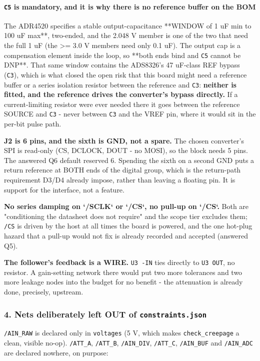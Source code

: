 \documentclass[11pt,a4paper]{article}
\begin{document}
\paragraph*{\texttt{C5} is mandatory, and it is why there is no reference buffer on the BOM}
The ADR4520 specifies a stable output-capacitance {*}{*}WINDOW of 1 uF min to 100 uF max{*}{*}, two-ended, and the 2.048 V member is one of the two that need the full 1 uF (the \textgreater{}= 3.0 V members need only 0.1 uF). The output cap is a compensation element inside the loop, so {*}{*}both ends bind and \texttt{C5} cannot be DNP{*}{*}. That same window contains the ADS8326's 47 uF-class REF bypass (\texttt{C3}), which is what closed the open risk that this board might need a reference buffer or a series isolation resistor between the reference and \texttt{C3}: \textbf{neither is fitted, and the reference drives the converter's bypass directly.} If a current-limiting resistor were ever needed there it goes between the reference SOURCE and \texttt{C3} - never between \texttt{C3} and the VREF pin, where it would sit in the per-bit pulse path.

\textbf{J2 is 6 pins, and the sixth is GND, not a spare.} The chosen converter's SPI is read-only (CS, DCLOCK, DOUT - no MOSI), so the block needs 5 pins. The answered Q6 default reserved 6. Spending the sixth on a second GND puts a return reference at BOTH ends of the digital group, which is the return-path requirement D3/D4 already impose, rather than leaving a floating pin. It is support for the interface, not a feature.

\textbf{No series damping on `/SCLK` or `/CS`, no pull-up on `/CS`.} Both are "conditioning the datasheet does not require" and the scope tier excludes them; \texttt{/CS} is driven by the host at all times the board is powered, and the one hot-plug hazard that a pull-up would not fix is already recorded and accepted (answered Q5).

\textbf{The follower's feedback is a WIRE.} \texttt{U3 -IN} ties directly to \texttt{U3 OUT}, no resistor. A gain-setting network there would put two more tolerances and two more leakage nodes into the budget for no benefit - the attenuation is already done, precisely, upstream.

\subsubsection*{4. Nets deliberately left OUT of \texttt{constraints.json}}
\texttt{/AIN\_RAW} is declared only in \texttt{voltages} (5 V, which makes \texttt{check\_creepage} a clean, visible no-op). \texttt{/ATT\_A}, \texttt{/ATT\_B}, \texttt{/AIN\_DIV}, \texttt{/ATT\_C}, \texttt{/AIN\_BUF} and \texttt{/AIN\_ADC} are declared nowhere, on purpose:
\end{document}
